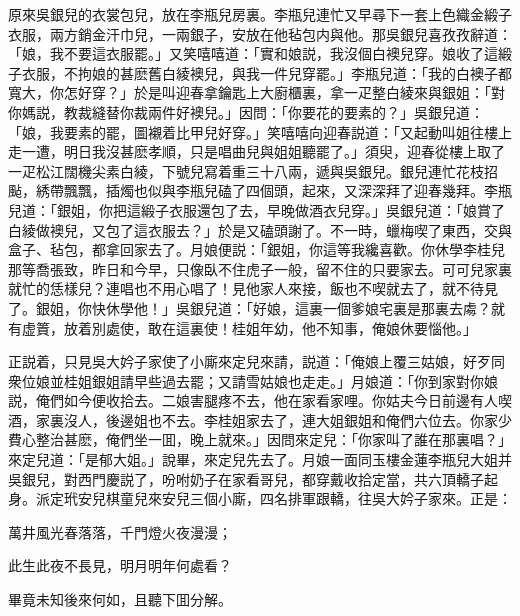 原來吳銀兒的衣裳包兒，放在李瓶兒房裏。李瓶兒連忙又早尋下一套上色織金緞子衣服，兩方銷金汗巾兒，一兩銀子，安放在他毡包内與他。那吳銀兒喜孜孜辭道：「娘，我不要這衣服罷。」又笑嘻嘻道：「實和娘説，我沒個白襖兒穿。娘收了這緞子衣服，不拘娘的甚麽舊白綾襖兒，與我一件兒穿罷。」李瓶兒道：「我的白襖子都寬大，你怎好穿？」於是叫迎春拿鑰匙上大廚櫃裏，拿一疋整白綾來與銀姐：「對你媽説，教裁縫替你裁兩件好襖兒。」因問：「你要花的要素的？」吳銀兒道：「娘，我要素的罷，圖襯着比甲兒好穿。」笑嘻嘻向迎春説道：「又起動叫姐往樓上走一遭，明日我沒甚麽孝順，只是唱曲兒與姐姐聽罷了。」須臾，迎春從樓上取了一疋松江闊機尖素白綾，下號兒寫着重三十八兩，遞與吳銀兒。銀兒連忙花枝招颭，綉帶飄飄，插燭也似與李瓶兒磕了四個頭，起來，又深深拜了迎春幾拜。李瓶兒道：「銀姐，你把這緞子衣服還包了去，早晚做酒衣兒穿。」吳銀兒道：「娘賞了白綾做襖兒，又包了這衣服去？」於是又磕頭謝了。不一時，蠟梅喫了東西，交與盒子、毡包，都拿回家去了。月娘便説：「銀姐，你這等我纔喜歡。你休學李桂兒那等喬張致，昨日和今早，只像臥不住虎子一般，留不住的只要家去。可可兒家裏就忙的恁樣兒？連唱也不用心唱了！見他家人來接，飯也不喫就去了，就不待見了。銀姐，你快休學他！」吳銀兒道：「好娘，這裏一個爹娘宅裏是那裏去䖏？就有虚篢，放着別處使，敢在這裏使！桂姐年幼，他不知事，俺娘休要惱他。」

正説着，只見吳大妗子家使了小廝來定兒來請，説道：「俺娘上覆三姑娘，好歹同衆位娘並桂姐銀姐請早些過去罷；又請雪姑娘也走走。」月娘道：「你到家對你娘説，俺們如今便收拾去。二娘害腿疼不去，他在家看家哩。你姑夫今日前邊有人喫酒，家裏沒人，後邊姐也不去。李桂姐家去了，連大姐銀姐和俺們六位去。你家少費心整治甚麽，俺們坐一囬，晚上就來。」因問來定兒：「你家叫了誰在那裏唱？」來定兒道：「是郁大姐。」說畢，來定兒先去了。月娘一面同玉樓金蓮李瓶兒大姐并吳銀兒，對西門慶説了，吩咐奶子在家看哥兒，都穿戴收拾定當，共六頂轎子起身。派定玳安兒棋童兒來安兒三個小廝，四名排軍跟轎，往吳大妗子家來。正是：

\begin{myquote}
萬井風光春落落，千門燈火夜漫漫；

此生此夜不長見，明月明年何處看？
\end{myquote}

畢竟未知後來何如，且聽下囬分解。

